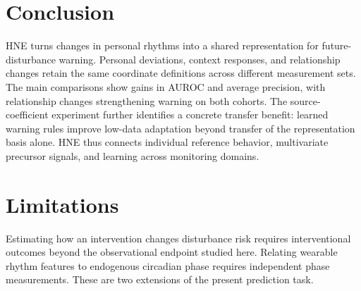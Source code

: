 \section{Conclusion}
HNE turns changes in personal rhythms into a shared representation for future-disturbance warning. Personal deviations, context responses, and relationship changes retain the same coordinate definitions across different measurement sets. The main comparisons show gains in AUROC and average precision, with relationship changes strengthening warning on both cohorts. The source-coefficient experiment further identifies a concrete transfer benefit: learned warning rules improve low-data adaptation beyond transfer of the representation basis alone. HNE thus connects individual reference behavior, multivariate precursor signals, and learning across monitoring domains.

\section*{Limitations}
Estimating how an intervention changes disturbance risk requires interventional outcomes beyond the observational endpoint studied here. Relating wearable rhythm features to endogenous circadian phase requires independent phase measurements. These are two extensions of the present prediction task.
